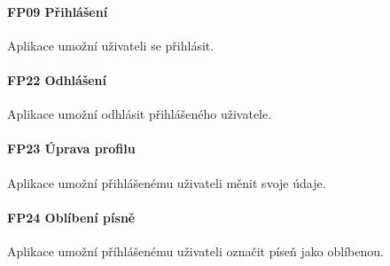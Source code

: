 \noindent \begin{minipage}{\textwidth}
    \paragraph{FP09 Přihlášení} \label{FP09}
    \begin{smallindent}{}
        Aplikace umožní uživateli se přihlásit.
    \end{smallindent}
\end{minipage}

\noindent \begin{minipage}{\textwidth}
    \paragraph{FP22 Odhlášení} \label{FP22}
    \begin{smallindent}{}
        Aplikace umožní odhlásit přihlášeného uživatele.
    \end{smallindent}
\end{minipage}

\noindent \begin{minipage}{\textwidth}
    \paragraph{FP23 Úprava profilu} \label{FP23}
    \begin{smallindent}{}
        Aplikace umožní přihlášenému uživateli měnit svoje údaje.
    \end{smallindent}
\end{minipage}


\noindent \begin{minipage}{\textwidth}
    \paragraph{FP24 Oblíbení písně} \label{FP24}
    \begin{smallindent}{}
        Aplikace umožní příhlášenému uživateli označit píseň jako oblíbenou.
    \end{smallindent}
\end{minipage}

